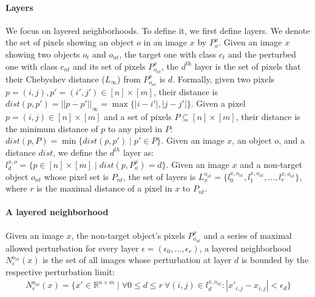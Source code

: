 \paragraph{Layers}
We focus on layered neighborhoods.
To define it, we first define layers. We denote the set of pixels showing an object $o$ in an image $x$ by $P_o^x$.
Given an image $x$ showing two objects $o_t$ and $o_{nt}$, the target one with class $c_t$ and the perturbed one with class $c_{nt}$ and its set of pixels ${P_{o_{nt}}^x}$, the $d^\text{th}$ layer is the set of pixels that their Chebyshev distance ($L_\infty$) from ${P_{o_{nt}}^x}$ is $d$.
Formally, given two pixels $p = (i,j), p' = (i', j') \in [n]\times [m]$, their distance is $dist(p, p') = ||p - p'||_\infty = \max\{|i - i'|, |j - j'|\}$.
Given a pixel $p = (i, j)\in [n]\times [m]$ and a set of pixels $P \subseteq [n]\times [m]$, their distance is the minimum distance of $p$ to any pixel in $P$: $dist(p, P) = \min\{dist(p, p') \mid p' \in P\}$.
Given an image $x$, an object $o$, and a distance $dist$, we define the $d^{th}$ layer as:
$l_d^{x,o} = \{p \in [n]\times [m] \mid dist(p, P_o^x) = d\}$.
Given an image $x$ and a non-target object $o_{nt}$ whose pixel set is $P_{nt}$, the set of layers is $L_x^{o_{nt}} = \{l_0^{x, o_{nt}}, l_1^{x, o_{nt}}, \ldots, l_r^{x, o_{nt}}\}$, where $r$ is the maximal distance of a pixel in $x$ to $P_{nt}$. %

\paragraph{A layered neighborhood} Given an image $x$, the non-target object's pixels ${P_{o_{nt}}^x}$ and a series of maximal allowed perturbation for every layer $\epsilon=(\epsilon_0,\ldots,\epsilon_r)$, a layered neighborhood ${N^{o_{nt}}_\epsilon}(x)$ is the set of all images whose perturbation at layer $d$ is bounded by the respective perturbation limit:
\begin{gather*}
    {N^{o_{nt}}_\epsilon}(x) = \{x' \in \mathbb{R}^{n \times m} \mid \forall 0\leq d\leq r\ \forall (i,j)\in l_d^{x,o_{nt}}: |x'_{i,j} - x_{i,j}|<\epsilon_d\}
\end{gather*}

